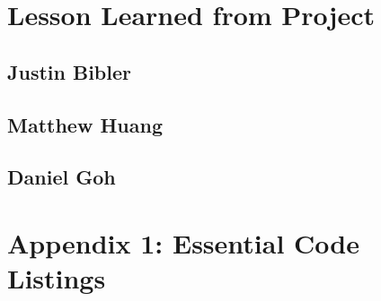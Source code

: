 \documentclass[10pt,journal,compsoc,draftclsnofoot]{IEEEtran}
\begin{document}
\begin{flushleft}
\section{Lesson Learned from Project}

\subsection{Justin Bibler}


\subsection{Matthew Huang}


\subsection{Daniel Goh}



\section{Appendix 1: Essential Code Listings}



\end{flushleft}
\end{document}
